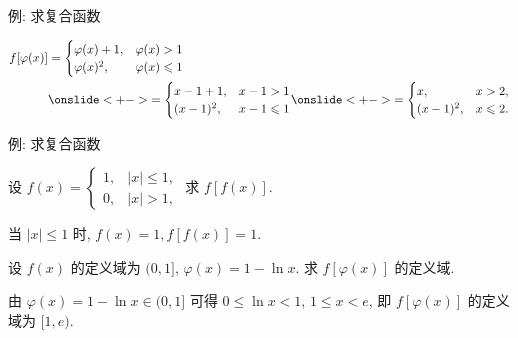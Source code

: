 \begin{frame}{例: 求复合函数}
	\onslide<+->
	\begin{solution}
		\begin{align*}
			f[\varphi(x)]&=\begin{cases}
				\varphi(x)+1,&\varphi(x)>1\\
				\varphi(x)^2,&\varphi(x)\le 1
			\end{cases}\\
			&\onslide<+->{=\begin{cases}
				x-1+1,&x-1>1\\
				(x-1)^2,&x-1\le 1
			\end{cases}}
			\onslide<+->{=\begin{cases}
				x,&x>2,\\
				(x-1)^2,&x\le 2.
			\end{cases}}\\
		\end{align*}
		\vspace{-\baselineskip}
		\onslide<+->{
			\[\varphi[f(x)]=f(x)-1=\begin{cases}
				x,&x>1,\\
				x^2-1,&x\le 1.
			\end{cases}\]
		}
	\end{solution}
\end{frame}


\begin{frame}{例: 求复合函数}
	\onslide<+->
	\begin{example}
		设 $f(x)=\begin{cases}
			1,&|x|\le 1,\\
			0,&|x|>1,
		\end{cases}$ 求 $f[f(x)]$.
	\end{example}
	\onslide<+->
	\begin{solution}
		当 $|x|\le 1$ 时, $f(x)=1,f[f(x)]=1$.
		\onslide<+->{故 $f[f(x)]=1$.
		}
	\end{solution}
	\onslide<+->
	\begin{example}
		设 $f(x)$ 的定义域为 $(0,1]$, $\varphi(x)=1-\ln x$. 求 $f[\varphi(x)]$ 的定义域.
	\end{example}
	\onslide<+->
	\begin{solution}
		由 $\varphi(x)=1-\ln x\in(0,1]$ 可得 $0\le \ln x<1$, $1\le x<e$, 即 $f[\varphi(x)]$ 的定义域为 $[1,e)$.
	\end{solution}
\end{frame}


